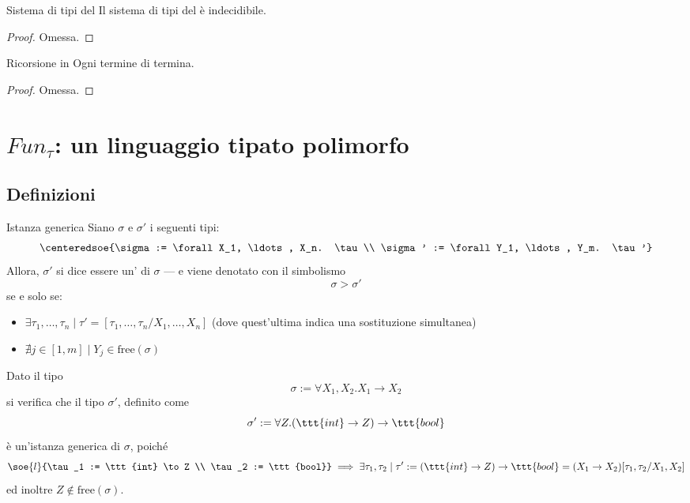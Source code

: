 \documentclass[a4paper, 12pt]{report}
\begin{document}
    \begin{framedthm}{Sistema di tipi del }
        Il sistema di tipi del  è indecidibile.
    \end{framedthm}

    \begin{proof}
        Omessa.
    \end{proof}

    \begin{framedprop}{Ricorsione in }
        Ogni termine di  termina.
    \end{framedprop}

    \begin{proof}
        Omessa.
    \end{proof}

    \section{$Fun_\tau$: un linguaggio tipato polimorfo}

    \subsection{Definizioni}

    \begin{frameddefn}{Istanza generica}
        Siano $\sigma$ e $\sigma'$ i seguenti tipi: $$\centeredsoe{\sigma := \forall X_1, \ldots, X_n. \tau \\ \sigma' := \forall Y_1, \ldots, Y_m. \tau'}$$ Allora, $\sigma'$ si dice essere un' di $\sigma$ --- e viene denotato con il simbolismo $$\sigma > \sigma '$$ se e solo se:

        \begin{itemize}
            \item $\exists \tau_1, \ldots, \tau_n \mid \tau' = [\tau_1, \ldots , \tau_n/X_1, \ldots, X_n]$ (dove quest'ultima indica una sostituzione simultanea)
            \item $\nexists j \in [1, m] \mid Y_j \in \mathrm{free}(\sigma)$
        \end{itemize}
    \end{frameddefn}

    \begin{example}
        Dato il tipo $$\sigma := \forall X_1, X_2.X_1 \to X_2$$ si verifica che il tipo $\sigma'$, definito come $$\sigma' := \forall Z. (\ttt{int} \to Z) \to \ttt{bool}$$ è un'istanza generica di $\sigma$, poiché $$\soe{l}{\tau_1 := \ttt{int} \to Z \\ \tau_2 := \ttt{bool}} \implies \exists \tau_1, \tau_2 \mid \tau' := (\ttt{int} \to Z) \to \ttt{bool} = (X_1 \to X_2)[\tau_1, \tau_2/X_1, X_2]$$ ed inoltre $Z \notin \mathrm{free}(\sigma)$.
    \end{example}
\end{document}
